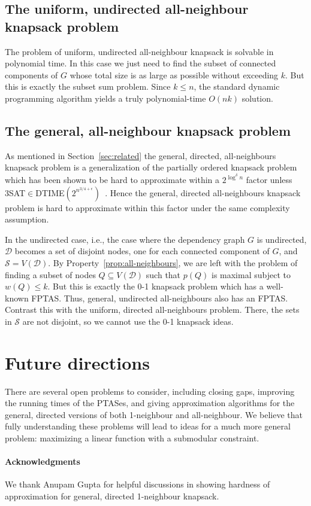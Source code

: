 \documentclass[12pt]{article}
\begin{document}
\subsection{The uniform, undirected all-neighbour knapsack problem}

The problem of uniform, undirected all-neighbour knapsack is
solvable in polynomial time.
In this case we just need to find the subset of connected components of $G$
whose total size is as large as possible without exceeding $k$.
But this is exactly the subset sum problem.  Since $k \leq n$, the standard
dynamic programming algorithm yields a truly polynomial-time $O(nk)$
solution.

\subsection{The general, all-neighbour knapsack problem}

As mentioned in Section~\ref{sec:related} the general, directed, all-neighbours
knapsack problem is a generalization of the partially ordered knapsack
problem~\cite{Kolliopoulos:2007p1242} which has been shown to be hard to
approximate within a $2^{\log^\delta n}$ factor unless
3SAT$\in$DTIME$(2^{n^{3/4+\epsilon}})$~\cite{Hajiaghayi:2006p1244}.
Hence the general, directed all-neighbours knapsack problem is hard
to approximate within this factor under the same complexity assumption.

In the undirected case, i.e., the case where the dependency graph $G$
is undirected, $\mathcal{D}$ becomes a set of disjoint nodes,
one for each connected component of $G$,
and $\mathcal{S}=V(\mathcal{D})$.  By Property~\ref{prop:all-neighbours},
we are left with the problem of finding a subset of nodes $Q \subseteq
V(\mathcal{D})$ such that $p(Q)$ is maximal subject to $w(Q) \leq k$.
But this is exactly the 0-1 knapsack problem which has a well-known
FPTAS.  Thus, general, undirected all-neighbours also has an FPTAS.
Contrast this with the uniform, directed all-neighbours problem.
There, the sets in $\mathcal{S}$ are not disjoint, so we cannot use
the 0-1 knapsack ideas.


\section{Future directions}

There are several open problems to consider, including closing gaps,
improving the running times of the PTASes, and giving approximation
algorithms for the general, directed versions of both 1-neighbour and
all-neighbour. We believe that fully understanding these problems will
lead to ideas for a much more general problem: maximizing a linear
function with a submodular constraint.






\paragraph{{\bf Acknowledgments}}
We thank Anupam Gupta for helpful
discussions in showing hardness of approximation for general,
directed 1-neighbour knapsack.






\newpage
\end{document}
